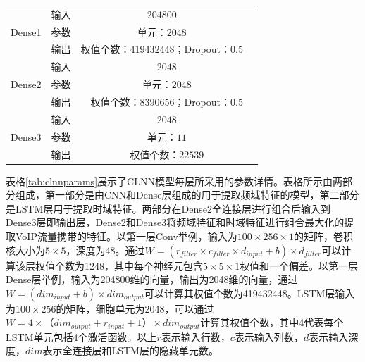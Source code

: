 \begin{table} [htb]
\begin{tabular}{|c|c|c|c|}
\cline{1-3}
\multirow{3}{*}{Dense1}&
输入& $204800$ & \\
\cline{2-3}
  & 参数&单元：$2048$ &  \\
\cline{2-3}
  & 输出 & 权值个数：$419432448$；Dropout：$0.5$ &  \\  

\cline{1-4}
\multirow{3}{*}{Dense2}&
输入& \multicolumn{2}{c|}{$2048$}  \\
\cline{2-4}
  & 参数&\multicolumn{2}{c|}{单元：$2048$}   \\
\cline{2-4}
  & 输出 &\multicolumn{2}{c|}{权值个数：$8390656$；Dropout：$0.5$}    \\  
\hline
\multirow{3}{*}{Dense3}&
输入&\multicolumn{2}{c|}{$2048$} \\
\cline{2-4}&
参数&\multicolumn{2}{c|}{单元：$11$}\\
\cline{2-4}&
输出&\multicolumn{2}{c|}{权值个数：$22539$}\\
\hline
\end{tabular}
\end{table}



表格\ref{tab:clnnparams}展示了CLNN模型每层所采用的参数详情。表格所示由两部分组成，第一部分是由CNN和Dense层组成的用于提取频域特征的模型，第二部分是LSTM层用于提取时域特征。两部分在Dense2全连接层进行组合后输入到Dense3层即输出层，Dense2和Dense3将频域特征和时域特征进行组合最大化的提取VoIP流量携带的特征。以第一层Conv举例，输入为$100 \times 256 \times 1$的矩阵，卷积核大小为$5 \times 5 $，深度为48。通过${W} = (r_{filter} \times c_{filter} \times d_{input} + b) \times d_{filter}$可以计算该层权值个数为1248，其中每个神经元包含$5 \times 5 \times 1$权值和一个偏差。以第一层Dense层举例，输入为204800维的向量，输出为2048维的向量，通过${W} = (dim_{input} + b) \times dim_{output}$可以计算其权值个数为419432448。LSTM层输入为$100 \times 256$的矩阵，细胞单元为2048，可以通过${W} = 4 \times （dim_{output}+r_{input}+1）\times dim_{output}$计算其权值个数，其中4代表每个LSTM单元包括4个激活函数。以上$r$表示输入行数，$c$表示输入列数，$d$表示输入深度，$dim$表示全连接层和LSTM层的隐藏单元数。



